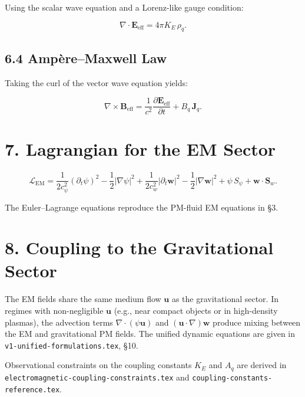 \documentclass{article}
\begin{document}
Using the scalar wave equation and a Lorenz-like gauge condition:


\[
\nabla\cdot \mathbf E_{\mathrm{eff}}
= 4\pi K_E\,\rho_q.
\]


\subsection*{6.4 Amp\`ere--Maxwell Law}

Taking the curl of the vector wave equation yields:


\[
\nabla\times \mathbf B_{\mathrm{eff}}
=
\frac{1}{c^2}\frac{\partial \mathbf E_{\mathrm{eff}}}{\partial t}
+ B_q\,\mathbf J_q.
\]


\section*{7. Lagrangian for the EM Sector}


\[
\mathcal{L}_{\mathrm{EM}}
=
\frac{1}{2c_\psi^2}(\partial_t \psi)^2
- \frac{1}{2}|\nabla \psi|^2
+
\frac{1}{2c_w^2}|\partial_t \mathbf w|^2
- \frac{1}{2}|\nabla \mathbf w|^2
+
\psi\,S_\psi
+
\mathbf w\cdot\mathbf S_w.
\]


The Euler--Lagrange equations reproduce the PM-fluid EM equations in \S3.

\section*{8. Coupling to the Gravitational Sector}

The EM fields share the same medium flow $\mathbf u$ as the gravitational sector.
In regimes with non-negligible $\mathbf u$ (e.g., near compact objects or in
high-density plasmas), the advection terms $\nabla\cdot(\psi\mathbf u)$ and
$(\mathbf u\cdot\nabla)\mathbf w$ produce mixing between the EM and gravitational
PM fields.  The unified dynamic equations are given in
\texttt{v1-unified-formulations.tex}, \S10.

Observational constraints on the coupling constants $K_E$ and $A_q$ are derived
in \texttt{electromagnetic-coupling-constraints.tex} and
\texttt{coupling-constants-reference.tex}.

\end{document}
